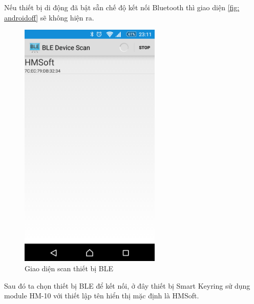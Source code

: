 Nếu thiết bị di động đã bật sẵn chế độ kết nối Bluetooth thì giao diện \ref{fig: androidoff} sẽ không hiện ra.

	\begin{figure}[H]
		\centering    
		\includegraphics[width=0.6\textwidth]{android1}
		\caption[Giao diện scan thiết bị BLE]{Giao diện scan thiết bị BLE}
		\label{fig: android1}
	\end{figure}
Sau đó ta chọn thiết bị BLE để kết nối, ở đây thiết bị Smart Keyring sử dụng module HM-10 với thiết lập tên hiển thị mặc định là HMSoft. 
